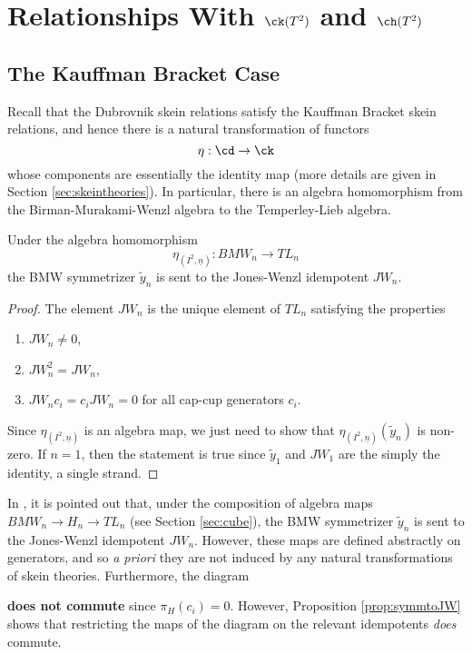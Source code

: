 \section{Relationships With $\ck(T^2)$ and $\ch(T^2)$} \label{sec:compatibility}

\subsection{The Kauffman Bracket Case}

Recall that the Dubrovnik skein relations satisfy the Kauffman Bracket skein relations, and hence there is a natural transformation of functors
\[
\eta: \cd \to \ck
\]
whose components are essentially the identity map (more details are given in Section \ref{sec:skeintheories}). In particular, there is an algebra homomorphism from the Birman-Murakami-Wenzl algebra to the Temperley-Lieb algebra.

\begin{proposition} \label{prop:symmtoJW}
Under the algebra homomorphism
\[
\eta_{(I^2, \underline{n})}: BMW_n \to TL_n
\]
the BMW symmetrizer $\tilde{y}_n$ is sent to the Jones-Wenzl idempotent $JW_n$.
\end{proposition}
\begin{proof}
The element $JW_n$ is the unique element of $TL_n$ satisfying the properties
\begin{enumerate}
\item $JW_n \neq 0$,
\item $JW_n^2 = JW_n$,
\item $JW_n c_i = c_i JW_n = 0$ for all cap-cup generators $c_i$. 
\end{enumerate}
Since $\eta_{(I^2, \underline{n})}$ is an algebra map, we just need to show that $\eta_{(I^2, \underline{n})}(\tilde{y}_n)$ is non-zero. If $n=1$, then the statement is true since $\tilde{y}_1$ and $JW_1$ are the simply the identity, a single strand. 
 
\end{proof}

\begin{remark}
In , it is pointed out that, under the composition of algebra maps $BMW_n \to H_n \to TL_n$ (see Section \ref{sec:cube}), the BMW symmetrizer $\tilde{y}_n$ is sent to the Jones-Wenzl idempotent $JW_n$. However, these maps are defined abstractly on generators, and so \textit{a priori} they are not induced by any natural transformations of skein theories. Furthermore, the diagram
\begin{center}
\end{center}
\textbf{does not commute} since $\pi_H(c_i)=0$. However, Proposition \ref{prop:symmtoJW} shows that restricting the maps of the diagram on the relevant idempotents \textit{does} commute.
\end{remark}

